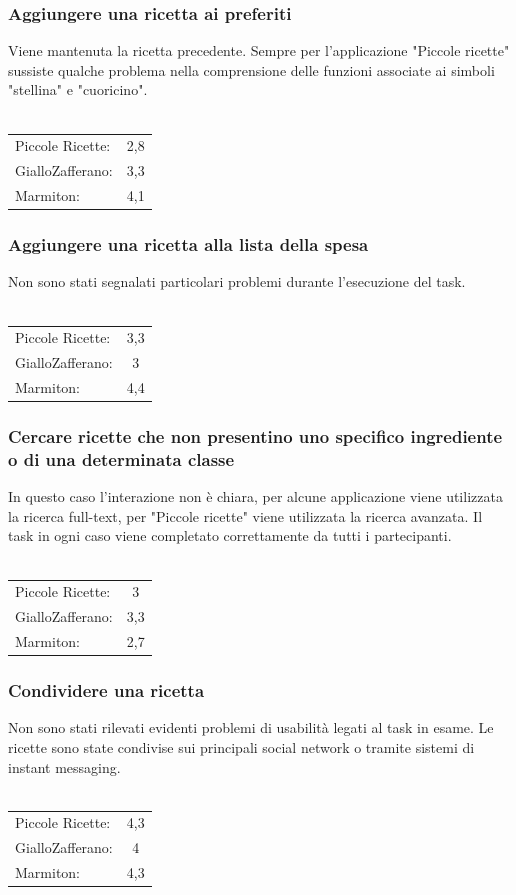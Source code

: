 \subsubsection{Aggiungere una ricetta ai preferiti}
Viene mantenuta la ricetta precedente.  Sempre per l'applicazione "Piccole
ricette" sussiste qualche problema nella comprensione delle funzioni associate ai
simboli "stellina" e "cuoricino".\\\\
\begin{tabular}{l c}
Piccole Ricette: & 2,8\\
GialloZafferano: & 3,3\\
Marmiton: & 4,1\\
\end{tabular}

\subsubsection{Aggiungere una ricetta alla lista della spesa}
Non sono stati segnalati particolari problemi durante l'esecuzione del
task.\\\\
\begin{tabular}{l c}
Piccole Ricette: & 3,3\\
GialloZafferano: & 3\\
Marmiton: & 4,4\\
\end{tabular}

\subsubsection{Cercare ricette che non presentino uno specifico ingrediente o di
una determinata classe}
In questo caso l'interazione non è chiara, per alcune applicazione viene
utilizzata la ricerca full-text, per "Piccole ricette" viene utilizzata la
ricerca avanzata.  Il task in ogni caso viene completato correttamente da tutti
i partecipanti.\\\\
\begin{tabular}{l c}
Piccole Ricette: & 3\\
GialloZafferano: & 3,3\\
Marmiton: & 2,7\\
\end{tabular}

\subsubsection{Condividere una ricetta}
Non sono stati rilevati evidenti problemi di usabilità legati al task in
esame.  Le ricette sono state condivise sui principali social network o tramite
sistemi di instant messaging.\\\\
\begin{tabular}{l c}
Piccole Ricette: & 4,3\\
GialloZafferano: & 4\\
Marmiton: & 4,3\\
\end{tabular}

